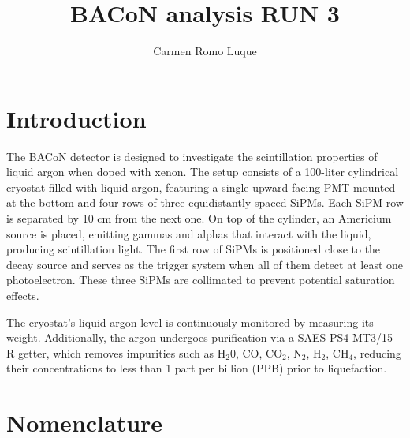 \documentclass[11pt,a4paper,english,oneside, pdf]{article}
\title{BACoN analysis RUN 3}
\author{Carmen Romo Luque}
\begin{document}
	\maketitle
	
	
	\tableofcontents
	
	
	\clearpage
	
	\section{Introduction}	 
	 The BACoN detector is designed to investigate the scintillation properties of liquid argon when doped with xenon. The setup consists of a 100-liter cylindrical cryostat filled with liquid argon, featuring a single upward-facing PMT mounted at the bottom and four rows of three equidistantly spaced SiPMs. Each SiPM row is separated by 10 cm from the next one. On top of the cylinder, an Americium source is placed, emitting gammas and alphas that interact with the liquid, producing scintillation light. The first row of SiPMs is positioned close to the decay source and serves as the trigger system when all of them detect at least one photoelectron. These three SiPMs are collimated to prevent potential saturation effects.
	 
	 
	 The cryostat's liquid argon level is continuously monitored by measuring its weight. Additionally, the argon undergoes purification via a SAES PS4-MT3/15-R getter, which removes impurities such as H$_2$0, CO, CO$_2$, N$_2$, H$_2$, CH$_4$, reducing their concentrations to less than 1 part per billion (PPB) prior to liquefaction.
	 
	 
	 \clearpage
	 
	 \section{Nomenclature}
	 
\end{document}

